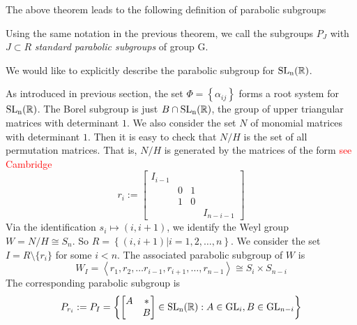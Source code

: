 The above theorem leads to the following definition of parabolic subgroups
\begin{definition}
    Using the same notation in the previous theorem, we call the subgroups $P_J$ with $J \subset R$  \textit{standard parabolic subgroups} of group G.
\end{definition}
We would like to explicitly describe the parabolic subgroup for $\operatorname{\text{SL}_n(\mathbb{R})}$.
\begin{example}
    As introduced in previous section, the set $\Phi = \left\lbrace \alpha_{ij}\right\rbrace $ forms a
    root system for $\operatorname{\text{SL}_n(\mathbb{R})}$. The Borel subgroup is just $B \cap \operatorname{\text{SL}_n(\mathbb{R})}$, the group of upper triangular matrices with determinant $1$.
    We also consider the set $N$ of monomial matrices  with determinant $1$. Then it is easy to check that
    $N/H$ is the set of all permutation matrices. That is, $N/H$ is generated by the
    matrices of the form \textcolor{red}{see Cambridge}
    \[r_i := \begin{bmatrix}
            I_{i-1} &   &   &           \\
                    & 0 & 1 &           \\
                    & 1 & 0 &           \\
                    &   &   & I_{n-i-1}
        \end{bmatrix}\]
    Via the identification $s_i \mapsto (i,i+1)$, we identify  the Weyl group $W = N/H \cong S_n$. So
    $R = \left\lbrace (i,i+1)| i = 1,2,\ldots,n\right\rbrace $. We consider the set
    $I = R \setminus \{r_i\}$ for some $i<n$. The associated parabolic subgroup of
    $W$ is
    \[W_I = \left\langle r_1,r_2,\ldots r_{i-1},r_{i+1},\ldots, r_{n-1} \right\rangle \cong
        S_i \times S_{n-i}\]
    The corresponding parabolic subgroup is
    \[P_{r_i} := P_I = \left\lbrace \begin{bmatrix}
            A & \ast \\
              & B
        \end{bmatrix} \in \operatorname{\text{SL}_n(\mathbb{R})}: A \in \text{GL}_i, B \in \text{GL}_{n-i}\right\rbrace \]
\end{example}
